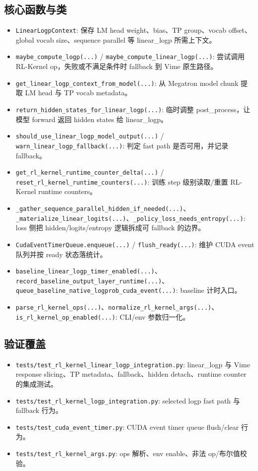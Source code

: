 \documentclass[11pt,a4paper]{ctexart}
\newcommand{\code}[1]{{\small\nolinkurl{#1}}}
\begin{document}
\subsection{核心函数与类}
\begin{itemize}
  \item \code{LinearLogpContext}: 保存 LM head weight、bias、TP group、vocab offset、global vocab size、sequence parallel 等 linear\_logp 所需上下文。
  \item \code{maybe_compute_logp(...)} / \code{maybe_compute_linear_logp(...)}: 尝试调用 RL-Kernel op，失败或不满足条件时 fallback 到 Vime 原生路径。
  \item \code{get_linear_logp_context_from_model(...)}: 从 Megatron model chunk 提取 LM head 与 TP vocab metadata。
  \item \code{return_hidden_states_for_linear_logp(...)}: 临时调整 post\_process，让模型 forward 返回 hidden states 给 linear\_logp。
  \item \code{should_use_linear_logp_model_output(...)} / \code{warn_linear_logp_fallback(...)}: 判定 fast path 是否可用，并记录 fallback。
  \item \code{get_rl_kernel_runtime_counter_delta(...)} / \code{reset_rl_kernel_runtime_counters(...)}: 训练 step 级别读取/重置 RL-Kernel runtime counters。
  \item \code{_gather_sequence_parallel_hidden_if_needed(...)}、\code{_materialize_linear_logits(...)}、\code{_policy_loss_needs_entropy(...)}: loss 侧把 hidden/logits/entropy 逻辑拆成可 fallback 的边界。
  \item \code{CudaEventTimerQueue.enqueue(...)} / \code{flush_ready(...)}: 维护 CUDA event 队列并按 ready 状态落统计。
  \item \code{baseline_linear_logp_timer_enabled(...)}、\code{record_baseline_output_layer_runtime(...)}、\code{queue_baseline_native_logprob_cuda_event(...)}: baseline 计时入口。
  \item \code{parse_rl_kernel_ops(...)}、\code{normalize_rl_kernel_args(...)}、\code{is_rl_kernel_op_enabled(...)}: CLI/env 参数归一化。
\end{itemize}

\subsection{验证覆盖}
\begin{itemize}
  \item \code{tests/test_rl_kernel_linear_logp_integration.py}: linear\_logp 与 Vime response slicing、TP metadata、fallback、hidden detach、runtime counter 的集成测试。
  \item \code{tests/test_rl_kernel_logp_integration.py}: selected logp fast path 与 fallback 行为。
  \item \code{tests/test_cuda_event_timer.py}: CUDA event timer queue flush/clear 行为。
  \item \code{tests/test_rl_kernel_args.py}: ops 解析、env enable、非法 op/布尔值校验。
\end{itemize}
\end{document}
